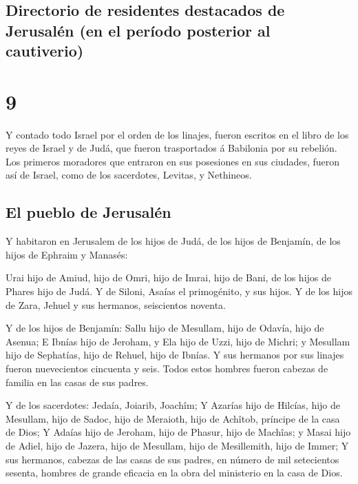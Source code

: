 \hypertarget{directorio-de-residentes-destacados-de-jerusaluxe9n-en-el-peruxedodo-posterior-al-cautiverio}{%
\subsection{Directorio de residentes destacados de Jerusalén (en el
período posterior al
cautiverio)}\label{directorio-de-residentes-destacados-de-jerusaluxe9n-en-el-peruxedodo-posterior-al-cautiverio}}

\hypertarget{section-8}{%
\section{9}\label{section-8}}

 Y contado todo Israel por el orden de los linajes, fueron
escritos en el libro de los reyes de Israel y de Judá, que fueron
trasportados á Babilonia por su rebelión.  Los primeros
moradores que entraron en sus posesiones en sus ciudades, fueron así de
Israel, como de los sacerdotes, Levitas, y Nethineos.

\hypertarget{el-pueblo-de-jerusaluxe9n}{%
\subsection{El pueblo de Jerusalén}\label{el-pueblo-de-jerusaluxe9n}}

 Y habitaron en Jerusalem de los hijos de Judá, de los
hijos de Benjamín, de los hijos de Ephraim y Manasés:

 Urai hijo de Amiud, hijo de Omri, hijo de Imrai, hijo de
Bani, de los hijos de Phares hijo de Judá.  Y de Siloni,
Asaías el primogénito, y sus hijos.  Y de los hijos de
Zara, Jehuel y sus hermanos, seiscientos noventa.

 Y de los hijos de Benjamín: Sallu hijo de Mesullam, hijo
de Odavía, hijo de Asenua;  E Ibnías hijo de Jeroham, y
Ela hijo de Uzzi, hijo de Michri; y Mesullam hijo de Sephatías, hijo de
Rehuel, hijo de Ibnías.  Y sus hermanos por sus linajes
fueron nuevecientos cincuenta y seis. Todos estos hombres fueron cabezas
de familia en las casas de sus padres.

 Y de los sacerdotes: Jedaía, Joiarib, Joachîm;
 Y Azarías hijo de Hilcías, hijo de Mesullam, hijo de
Sadoc, hijo de Meraioth, hijo de Achîtob, príncipe de la casa de Dios;
 Y Adaías hijo de Jeroham, hijo de Phasur, hijo de
Machîas; y Masai hijo de Adiel, hijo de Jazera, hijo de Mesullam, hijo
de Mesillemith, hijo de Immer;  Y sus hermanos, cabezas
de las casas de sus padres, en número de mil setecientos sesenta,
hombres de grande eficacia en la obra del ministerio en la casa de Dios.

